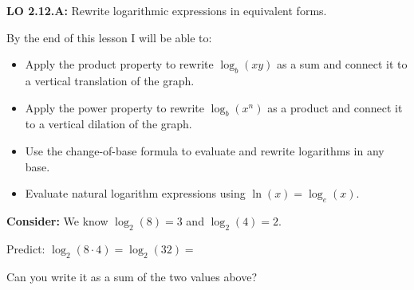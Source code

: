 \documentclass[10pt]{article}
\begin{document}
\namedateperiod

\vspace{0.1in}

\begin{objectivebox}
\textbf{LO 2.12.A:} Rewrite logarithmic expressions in equivalent forms.

By the end of this lesson I will be able to:
\begin{itemize}[leftmargin=1.5em,itemsep=3pt,topsep=3pt]
  \item Apply the product property to rewrite $\log_b(xy)$ as a sum and connect it to a
        vertical translation of the graph.
  \item Apply the power property to rewrite $\log_b(x^n)$ as a product and connect it to a
        vertical dilation of the graph.
  \item Use the change-of-base formula to evaluate and rewrite logarithms in any base.
  \item Evaluate natural logarithm expressions using $\ln(x) = \log_e(x)$.
\end{itemize}
\end{objectivebox}

\vspace{0.08in}

\begin{vocabbox}
\end{vocabbox}

\vspace{0.08in}

\begin{hookbox}
\textbf{Consider:} We know $\log_2(8) = 3$ and $\log_2(4) = 2$.

\vspace{4pt}
Predict: $\log_2(8 \cdot 4) = \log_2(32) = $ \writeline

\vspace{2pt}
Can you write it as a sum of the two values above?  \writeline
\end{hookbox}

\vspace{0.08in}
\end{document}
